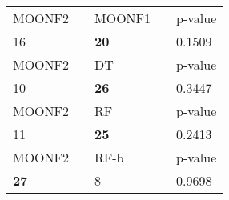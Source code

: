 \begin{tabular}{ l l l l l}
\midrule
{MOONF2} & & {MOONF1} & & {p-value}\\
16 & & \textbf{20} & & 0.1509\\
\midrule
{MOONF2} & & {DT} & & {p-value}\\
10 & & \textbf{26} & & 0.3447\\
\midrule
{MOONF2} & & {RF} & & {p-value}\\
11 & & \textbf{25} & & 0.2413\\
\midrule
{MOONF2} & & {RF-b} & & {p-value}\\
\textbf{27} & & 8 & & 0.9698\\
\midrule
\end{tabular}
